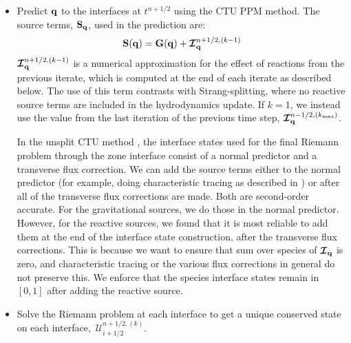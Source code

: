\documentclass[linenumbers]{aastex631}
\newcommand{\Ic}{{\boldsymbol{\mathcal{I}}}}
\newcommand{\kmax}{{k_\mathrm{max}}}
\newcommand{\Uc}{{\,\bm{\mathcal{U}}}}
\newcommand{\Sc}{\mathbf{S}}
\newcommand{\Sq}{{\bf S}_\qb}
\newcommand{\Sqhydro}{{\Sq^{\mathrm{hydro}}}}
\newcommand{\qb}{{\bf q}}
\newcommand{\Gb}{{\bf G}}
\newcommand{\MarginPar}[1]{\marginpar{\vskip-\baselineskip\raggedright\tiny\sffamily\hrule\smallskip{\color{red}#1}\par\smallskip\hrule}}
\begin{document}
\begin{itemize}
\begin{itemize}
\begin{itemize}
    \item Predict $\qb$ to the interfaces at $t^{n+1/2}$ using the CTU PPM
      method.  The source terms, $\Sq$, used in the prediction are:
      \begin{equation}
        \Sc(\qb) = \Gb(\qb) + \Ic_\qb^{n+1/2,(k-1)}
      \end{equation}
      $\Ic_\qb^{n+1/2,(k-1)}$ is a numerical approximation for the effect of
      reactions from the previous iterate, which is computed at the end of each iterate 
      as described below.
      The use of this term contrasts with Strang-splitting, where no
      reactive source terms are included in the hydrodynamics update.
      If $k=1$, we instead use the value from the last iteration of the previous
      time step, $\Ic^{n-1/2,(\kmax)}_{\qb}$.

      In the unsplit CTU method \citep{ppmunsplit}, the interface
      states used for the final Riemann problem through the zone
      interface consist of a normal predictor and a transverse flux
      correction.  We can add the source terms either to the normal
      predictor (for example, doing characteristic tracing as
      described in \citealt{ppm}) or after all of the transverse flux
      corrections are made.  Both are second-order accurate.  For the
      gravitational sources, we do those in the normal predictor.
      However, for the reactive sources, we found that it is most
      reliable to add them at the end of the interface state
      construction, after the transverse flux corrections.  This is
      because we want to ensure that sum over species of $\Ic_\qb$ is
      zero, and characteristic tracing or the various flux corrections
      in general do not preserve this.  We enforce that the species interface
      states remain in $[0, 1]$ after adding the reactive source.


    \item Solve the Riemann problem at each interface to get a unique
      conserved state on each interface, $\Uc^{n+1/2,(k)}_{i+1/2}$.


\end{itemize}
\end{itemize}
\end{itemize}
\end{document}
